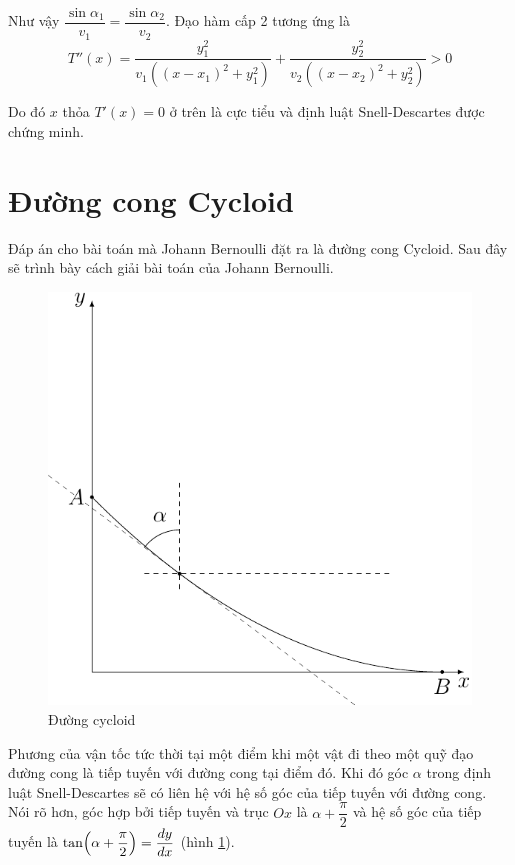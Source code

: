 \documentclass{mynotes}
\begin{document}
Như vậy $\dfrac{\sin \alpha_1}{v_1} = \dfrac{\sin \alpha_2}{v_2}$. Đạo hàm cấp 2 tương ứng là
\begin{equation*}
    T''(x) = \frac{y_1^2}{v_1 ((x - x_1)^2 + y_1^2)} + \frac{y_2^2}{v_2 ((x - x_2)^2 + y_2^2)} > 0
\end{equation*}

Do đó $x$ thỏa $T'(x) = 0$ ở trên là cực tiểu và định luật Snell-Descartes được chứng minh.

\section*{Đường cong Cycloid}

Đáp án cho bài toán mà Johann Bernoulli đặt ra là đường cong Cycloid. Sau đây sẽ trình bày cách giải bài toán của Johann Bernoulli.

\begin{figure}[ht]
    \centering
    \includegraphics{brachistochrone/brachistochrone.pdf}
    \caption{Đường cycloid}
    \label{cycloid:im1}
\end{figure}

Phương của vận tốc tức thời tại một điểm khi một vật đi theo một quỹ đạo đường cong là tiếp tuyến với đường cong tại điểm đó. Khi đó góc $\alpha$ trong định luật Snell-Descartes sẽ có liên hệ với hệ số góc của tiếp tuyến với đường cong. Nói rõ hơn, góc hợp bởi tiếp tuyến và trục $Ox$ là $\alpha + \dfrac{\pi}{2}$ và hệ số góc của tiếp tuyến là $\tan \Bigl(\alpha + \dfrac{\pi}{2}\Bigr) = \dfrac{dy}{dx}$ (hình \ref{cycloid:im1}).
\end{document}
